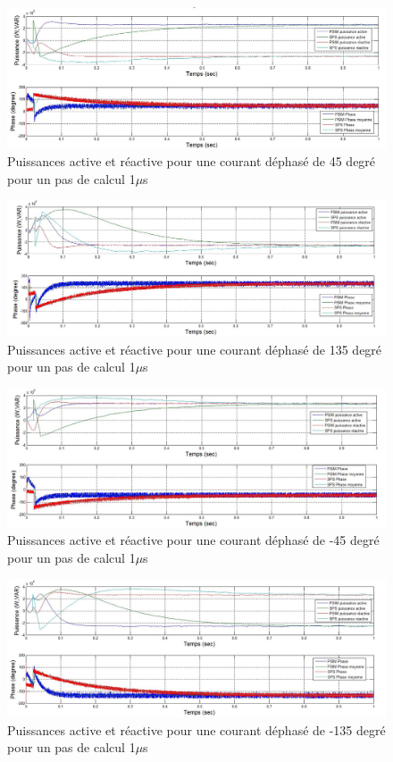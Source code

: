 \begin{figure}[htb]
\centering
\includegraphics[scale=0.5]{fig/AFEIDEAL/pui45.jpg}
\caption{Puissances active et réactive pour une courant déphasé de 45 degré pour un pas de calcul 1$\mu$s}
\label{AF_I_pui_45}
\end{figure}

\begin{figure}[htb]
\centering
\includegraphics[scale=0.5]{fig/AFEIDEAL/pui135.jpg}
\caption{Puissances active et réactive pour une courant déphasé de 135 degré pour un pas de calcul 1$\mu$s}
\label{AF_I_pui_135}
\end{figure}

\begin{figure}[htb]
\centering
\includegraphics[scale=0.5]{fig/AFEIDEAL/pui_45.jpg}
\caption{Puissances active et réactive pour une courant déphasé de -45 degré pour un pas de calcul 1$\mu$s}
\label{AF_I_pui__45}
\end{figure}

\begin{figure}[htb]
\centering
\includegraphics[scale=0.5]{fig/AFEIDEAL/pui_135.jpg}
\caption{Puissances active et réactive pour une courant déphasé de -135 degré pour un pas de calcul 1$\mu$s}
\label{AF_I_pui__135}
\end{figure}


